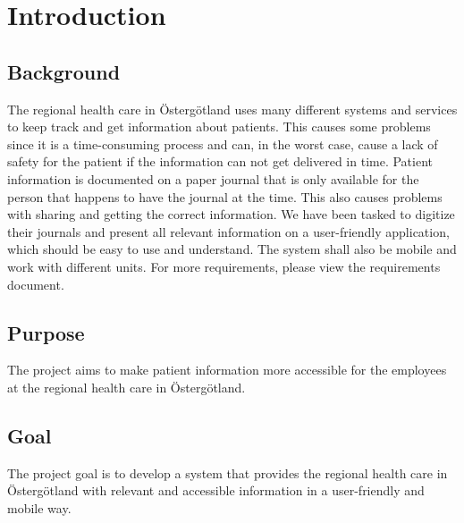 \section{Introduction}
\label{sec:introduction}

\subsection{Background}
\label{sec:background}

The regional health care in Östergötland uses many different systems and services to keep track and get information about patients. This causes some problems since it is a time-consuming process and can, in the worst case, cause a lack of safety for the patient if the information can not get delivered in time. Patient information is documented on a paper journal that is only available for the person that happens to have the journal at the time. This also causes problems with sharing and getting the correct information. We have been tasked to digitize their journals and present all relevant information on a user-friendly application, which should be easy to use and understand. The system shall also be mobile and work with different units. For more requirements, please view the requirements document. 

\subsection{Purpose}
\label{sec:purpose}

The project aims to make patient information more accessible for the employees at the regional health care in Östergötland.

\subsection{Goal}
\label{sec:goal}

The project goal is to develop a system that provides the regional health care in Östergötland with relevant and accessible information in a user-friendly and mobile way.


